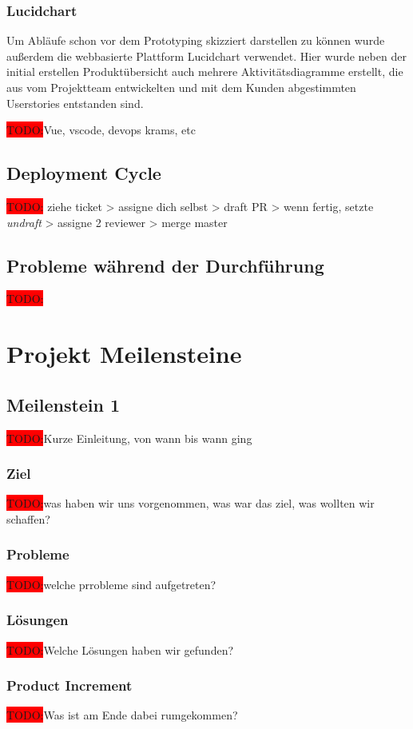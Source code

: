 \documentclass[10pt, a4paper, draft]{article}
\begin{document}
\subsubsection*{Lucidchart}
Um Abläufe schon vor dem Prototyping skizziert darstellen zu können wurde außerdem die webbasierte Plattform \glqq Lucidchart\grqq{} verwendet.
Hier wurde neben der initial erstellen Produktübersicht auch mehrere Aktivitätsdiagramme erstellt, die aus vom Projektteam entwickelten und mit dem Kunden abgestimmten Userstories entstanden sind.


\colorbox{red}{TODO:}Vue, vscode, devops krams, etc


\subsection{Deployment Cycle}
\colorbox{red}{TODO:} ziehe ticket > assigne dich selbst > draft PR > wenn fertig, setzte \textit{undraft} > assigne 2 reviewer > merge master

\subsection{Probleme während der Durchführung}
\colorbox{red}{TODO:}

\section{Projekt Meilensteine}
\subsection{Meilenstein 1}
\colorbox{red}{TODO:}Kurze Einleitung, von wann bis wann ging
\subsubsection{Ziel}
\colorbox{red}{TODO:}was haben wir uns vorgenommen, was war das ziel, was wollten wir schaffen?
\subsubsection{Probleme}
\colorbox{red}{TODO:}welche prrobleme sind aufgetreten?

\subsubsection{Lösungen}
\colorbox{red}{TODO:}Welche Lösungen haben wir gefunden?

\subsubsection{Product Increment}
\colorbox{red}{TODO:}Was ist am Ende dabei rumgekommen?
\end{document}
